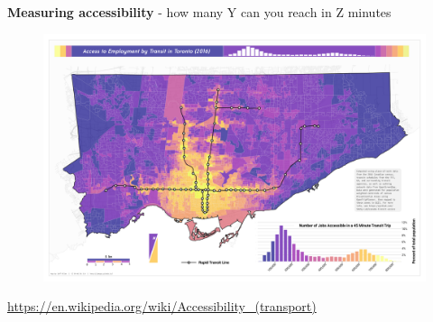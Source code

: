 \documentclass[aspectratio=169]{beamer}
\begin{document}
	

\begin{frame}
	
	\textbf{Measuring accessibility} - how many Y can you reach in Z minutes
	
	\begin{figure}
		\centering
		\includegraphics[width=0.86\linewidth]{images/tor_access.png}
	\end{figure}

	\tiny\url{https://en.wikipedia.org/wiki/Accessibility_(transport)}
	
\end{frame}
\end{document}
